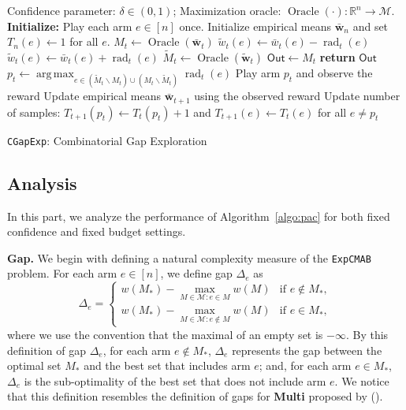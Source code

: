 \documentclass{article}
\newcommand{\Algorithm}{\texttt{CGapExp}\xspace}
\newcommand{\Problem}{\texttt{ExpCMAB}\xspace}
\newcommand{\M}{\mathcal M}
\newcommand{\del}{\backslash}
\newcommand{\RR}{\mathbb R}
\DeclareMathOperator{\rad}{rad}
\DeclareMathOperator*{\argmax}{arg\,max}
\DeclareMathOperator{\Oracle}{Oracle}
\newcommand{\out}{\mathsf{Out}}
\newcommand{\MultiIdent}{\textbf{Multi}\xspace}
\renewcommand{\vec}[1]{\boldsymbol{#1}}
\begin{document}
\begin{spacing}{1.1}
\begin{algorithm}[htbp]
\begin{algorithmic}[1]
\Require Confidence parameter: $\delta \in (0,1)$; Maximization oracle: $\Oracle(\cdot): \RR^n \rightarrow \M$.
\Statex \textbf{Initialize:} Play each arm $e \in [n]$ once. Initialize empirical means $\vec {\bar w}_n$ and set $T_{n}(e) \gets 1$ for all $e$.
	\State $M_t \gets \Oracle(\vec {\bar w}_t)$
			\State $\tilde w_t(e) \gets \bar w_t(e)-\rad_t(e)$
		\Else
			\State $\tilde w_t(e) \gets \bar w_t(e)+\rad_t(e)$
		\EndIf
	\EndFor
	\State $\tilde M_t \gets \Oracle(\vec{\tilde w}_t)$
		\State $\out \gets M_t$
		\State \textbf{return} $\out$
	\EndIf
	\State $p_t \gets \argmax_{e\in (\tilde M_t \del M_t) \cup (M_t \del \tilde M_t)} \rad_t(e)$\label{algo:step:D}
	\State Play arm $p_t$ and observe the reward
	\State Update empirical means $\vec {\bar w}_{t+1}$ using the observed reward
	\State Update number of samples: $T_{t+1}(p_t)\gets T_{t}(p_t)+1$ and $T_{t+1}(e) \gets T_{t}(e)$ for all $e\not=p_t$
	\EndFor
\end{algorithmic}
\caption{\Algorithm: Combinatorial Gap Exploration}
\label{algo:pac}
\end{algorithm}


\subsection{Analysis}
In this part, we analyze the performance of Algorithm~\ref{algo:pac} for both fixed confidence and fixed budget settings. 


\textbf{Gap.} We begin with defining a natural complexity measure of the \Problem problem. 
For each arm $e \in [n]$, we define gap $\Delta_e$ as
\begin{equation}
\label{eq:define-delta}
\Delta_e = \begin{cases}
			   w(M_*)-\max_{M\in \M: e\in M} w(M) & \text{if } e\not \in M_*, \\
			   w(M_*)-\max_{M\in \M: e\not \in M} w(M) & \text{if } e\in M_*,
			\end{cases}
\end{equation}
where we use the convention that the maximal of an empty set is $-\infty$.
By this definition of gap $\Delta_e$, for each arm $e\not\in M_*$, $\Delta_e$ represents the gap between the optimal set $M_*$ and the best set that includes arm $e$; and, for each arm $e\in M_*$, $\Delta_e$ is the sub-optimality of the best set that does not include arm $e$.
We notice that this definition resembles the definition of gaps for \MultiIdent proposed by ().




\end{spacing}
\end{document}
